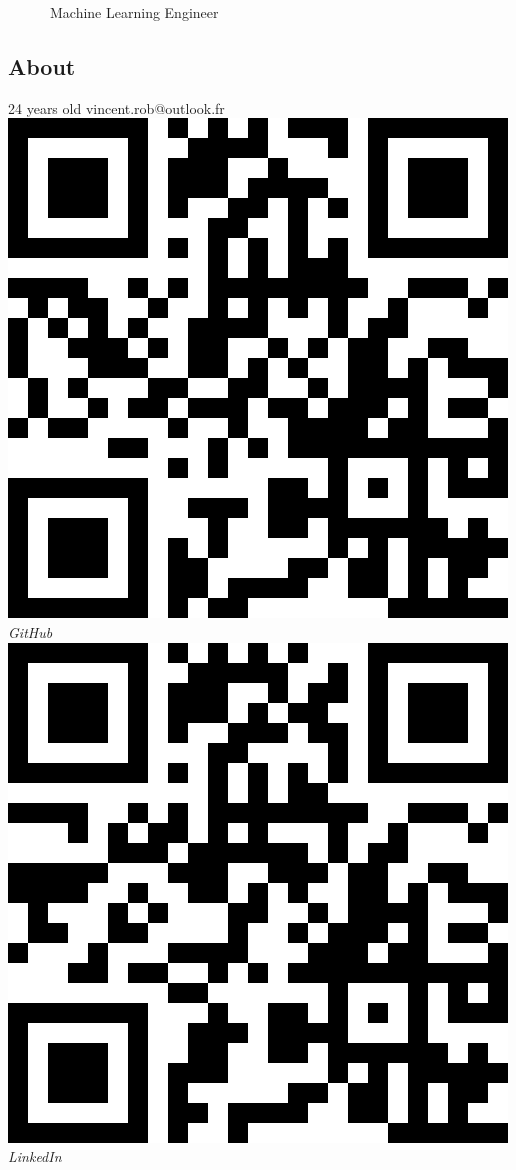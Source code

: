 \documentclass[]{source}
\begin{document}
{~~~~~~Machine Learning Engineer}

\begin{aside}
\section{About}
\vspace{0.65cm}
24 years old
vincent.rob@outlook.fr
\vspace{0.5cm}
\includegraphics[scale=0.2]{github.png}
\textit{GitHub}
\vspace{0.3cm}
\includegraphics[scale=0.2]{linked_in.png}
\textit{LinkedIn}

\end{aside}
\end{document}
